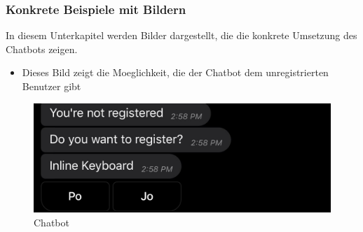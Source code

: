 \subsubsection{Konkrete Beispiele mit Bildern} 
In diesem Unterkapitel werden Bilder dargestellt, die die konkrete Umsetzung des Chatbots zeigen.
\begin{itemize}
	    \item Dieses Bild zeigt die Moeglichkeit, die der Chatbot dem unregistrierten Benutzer gibt
			
\end{itemize}
\begin{figure}[ht]

	\includegraphics[width=\linewidth]{./figures/Chatboti.jpeg}
	\caption{Chatbot}
	\label{fig:boat1}
\end{figure}


	
\label{\docname}

